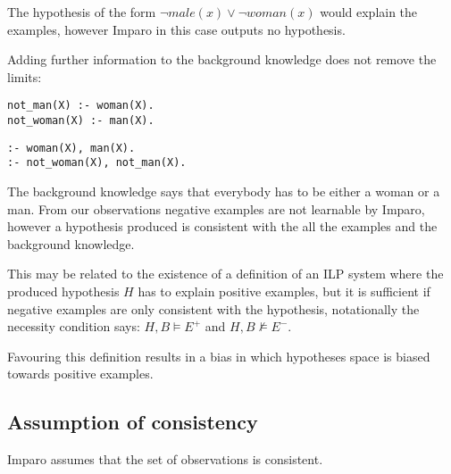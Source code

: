 The hypothesis of the form $\neg male(x) \vee \neg woman(x)$ would explain the examples, however Imparo in this case outputs no hypothesis.

Adding further information to the background knowledge does not remove the limits:

\begin{minipage}[t]{.45\textwidth}
\begin{lstlisting}
not_man(X) :- woman(X).
not_woman(X) :- man(X).
\end{lstlisting}
\end{minipage}
\begin{minipage}[t]{.20\textwidth}
\begin{lstlisting}
:- woman(X), man(X).
:- not_woman(X), not_man(X).
\end{lstlisting}
\end{minipage}

The background knowledge says that everybody has to be either a woman or a man. From our observations negative examples are not learnable by Imparo, however a hypothesis produced is consistent with the all the examples and the background knowledge.

This may be related to the existence of a definition of an ILP system where the produced hypothesis $H$ has to explain positive examples, but it is sufficient if negative examples are only consistent with the hypothesis, notationally the necessity condition says:
$H, B \models E^+$ and $H, B \not \models E^-$.

Favouring this definition results in a bias in which hypotheses space is biased towards positive examples.

\subsection{Assumption of consistency}\label{imparo_consistency_assumption}
Imparo assumes that the set of observations is consistent.

